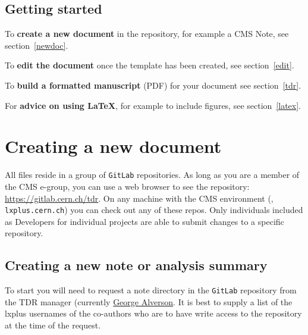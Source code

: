 \subsection{Getting started}

To \textbf{create a new document} in the repository, for example a CMS Note, see section~\ref{newdoc}.

To \textbf{edit the document} once the template has been created, see section~\ref{edit}.

To \textbf{build a formatted manuscript} (PDF) for your document see section~\ref{tdr}.

For \textbf{advice on using \LaTeX}, for example to include figures, see section~\ref{latex}.


\clearpage
\section{Creating a new document\label{newdoc}}


All files reside in a group of \texttt{GitLab} repositories.
As long as you are a member of the CMS e-group, you can use a web browser to see the repository: \url{https://gitlab.cern.ch/tdr}.
On any machine with the CMS environment (\eg, \texttt{lxplus.cern.ch}) you can check out any of these repos. Only individuals included as Developers for individual projects are able to submit changes to a specific repository.



\subsection{Creating a new note or analysis summary}

To start
you will need to request a note directory in the \texttt{GitLab} repository from the TDR manager (currently \href{mailto:George.Alverson@cern.ch}{George Alverson}. It is best to supply a list of the lxplus usernames of the co-authors who are to have write access to the repository at the time of the request.

